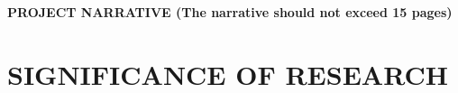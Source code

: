 \documentclass[11pt,letterpaper,english]{article}
\begin{document}
\setlength{\parindent}{0in} %

\pagestyle{fancy}   \renewcommand{%
\headrulewidth}{0.0pt}

\begin{center}
{\bf PROJECT NARRATIVE (The narrative should not exceed 15 pages)} 
\end{center}

\vspace{-.15in}




\vspace{-.25in}
\section{SIGNIFICANCE OF RESEARCH}
\vspace{-.2in}

\end{document}
